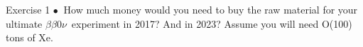 \documentclass [aspectratio=169]{beamer}
\newcommand{\bbonu}{\ensuremath{\beta\beta0\nu}}
\newcommand{\nne}{\ensuremath{\bar{N}_e}}
\newcommand{\nng}{\ensuremath{\bar{N}_\gamma}}
\begin{document}
\begin{frame}{Exercise 1}
$\bullet~$ How much money would you need to buy the raw material for your ultimate \bbonu\  experiment in 2017?  And in 2023? Assume you will need O(100) tons of Xe.
\end{frame}



%
%
%
%
%
%
%
%
%
%
%
%
\end{document}
